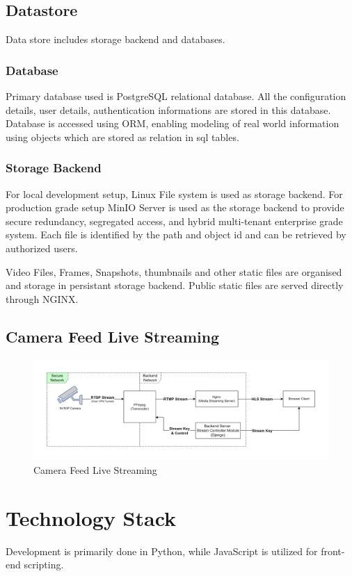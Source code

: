 \subsection{Datastore}
Data store includes storage backend and databases. 

	\subsubsection{Database}
	Primary database used is PostgreSQL relational database. All the configuration details, user details, authentication informations are stored in this database. Database is accessed using ORM, enabling modeling of real world information using objects which are stored as relation in sql tables.

	\subsubsection{Storage Backend}
	For local development setup, Linux File system is used as storage backend. For production grade setup MinIO Server is used as the storage backend to provide secure redundancy, segregated access, and hybrid multi-tenant enterprise grade system. Each file is identified by the path and object id and can be retrieved by authorized users. 

	Video Files, Frames, Snapshots, thumbnails and other static files are organised and storage in persistant storage backend. Public static files are served directly through NGINX.


\subsection{Camera Feed Live Streaming}
\begin{figure}[ht!]
	\centering
	\includegraphics[width=0.8\linewidth]{Images/live_stream_arch}
	\caption{Camera Feed Live Streaming}
	\label{fig:livestreamarch}
\end{figure}



\section{Technology Stack}
Development is primarily done in Python, while JavaScript is utilized for front-end scripting.

